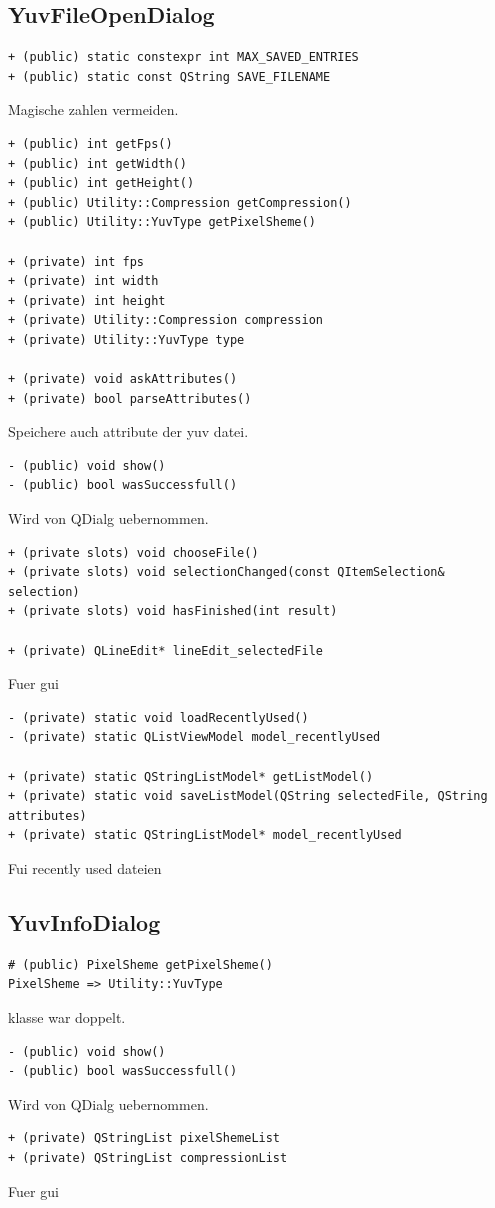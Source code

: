 \documentclass[parskip=full]{scrartcl}
\begin{document}
\subsection{YuvFileOpenDialog}
\begin{verbatim}
+ (public) static constexpr int MAX_SAVED_ENTRIES
+ (public) static const QString SAVE_FILENAME
\end{verbatim}
Magische zahlen vermeiden.
\begin{verbatim}
+ (public) int getFps()
+ (public) int getWidth()
+ (public) int getHeight()
+ (public) Utility::Compression getCompression()
+ (public) Utility::YuvType getPixelSheme()

+ (private) int fps
+ (private) int width
+ (private) int height
+ (private) Utility::Compression compression
+ (private) Utility::YuvType type

+ (private) void askAttributes()
+ (private) bool parseAttributes()
\end{verbatim}
Speichere auch attribute der yuv datei.
\begin{verbatim}
- (public) void show()
- (public) bool wasSuccessfull()
\end{verbatim}
Wird von QDialg uebernommen.
\begin{verbatim}
+ (private slots) void chooseFile()
+ (private slots) void selectionChanged(const QItemSelection& selection)
+ (private slots) void hasFinished(int result)

+ (private) QLineEdit* lineEdit_selectedFile
\end{verbatim}
Fuer gui
\begin{verbatim}
- (private) static void loadRecentlyUsed()
- (private) static QListViewModel model_recentlyUsed

+ (private) static QStringListModel* getListModel()
+ (private) static void saveListModel(QString selectedFile, QString attributes)
+ (private) static QStringListModel* model_recentlyUsed
\end{verbatim}
Fui recently used dateien
\subsection{YuvInfoDialog}
\begin{verbatim}
# (public) PixelSheme getPixelSheme()
PixelSheme => Utility::YuvType
\end{verbatim}
klasse war doppelt.
\begin{verbatim}
- (public) void show()
- (public) bool wasSuccessfull()
\end{verbatim}
Wird von QDialg uebernommen.
\begin{verbatim}
+ (private) QStringList pixelShemeList
+ (private) QStringList compressionList
\end{verbatim}
Fuer gui
\end{document}
